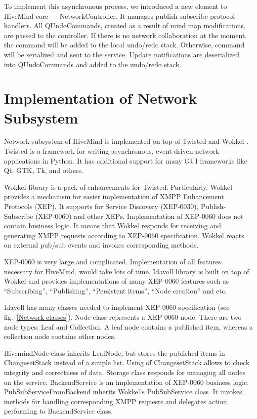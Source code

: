 To implement this asynchronous process, we introduced a new element to HiveMind
core --- NetworkController. It manages publish-subscribe protocol handlers. All
QUndoCommands, created as a result of mind map modifications, are passed to the
controller. If there is no network collaboration at the moment, the command will
be added to the local undo/redo stack. Otherwise, command will be serialized and
sent to the service. Update notifications are deserialized into QUndoCommands
and added to the undo/redo stack.


\section{Implementation of Network Subsystem}

Network subsystem of HiveMind is implemented on top of Twisted \cite{twisted} and
Wokkel \cite{wokkel}. Twisted is a framework for writing asynchronous,
event-driven network applications in Python. It has additional support for many
GUI frameworks like Qt, GTK, Tk, and others.

Wokkel library is a pack of enhancements for Twisted. Particularly, Wokkel
provides a mechanism for easier implementation of XMPP Enhancement Protocols
(XEP). It supports for Service Discovery (XEP-0030), Publish-Subscribe
(XEP-0060) and other XEPs. Implementation of XEP-0060 does not contain business
logic. It means that Wokkel responds for receiving and generating XMPP requests
according to XEP-0060 specification. Wokkel reacts on external pub/sub events
and invokes corresponding methods.

XEP-0060 is very large and complicated. Implementation of all features,
necessary for HiveMind, would take lots of time. Idavoll library is built on top
of Wokkel and provides implementations of many XEP-0060 features such as
``Subscribing'', ``Publishing'', ``Persistent items'', ``Node creation'' and
etc.

Idavoll has many classes needed to implement XEP-0060 specification (see
fig.~\ref{Network classes}). Node class represents a XEP-0060 node. There are
two node types: Leaf and Collection. A leaf node contains a published item,
whereas a collection node contains other nodes.

HivemindNode class inherits LeafNode, but stores the published items in
ChangesetStack instead of a simple list. Using of ChangesetStack allows to check
integrity and correctness of data. Storage class responds for managing all nodes
on the service. BackendService is an implementation of XEP-0060 business logic.
PubSubServiceFromBackend inherits Wokkel's PubSubService class. It invokes
methods for handling corresponding XMPP requests and delegates action performing
to BackendService class.


